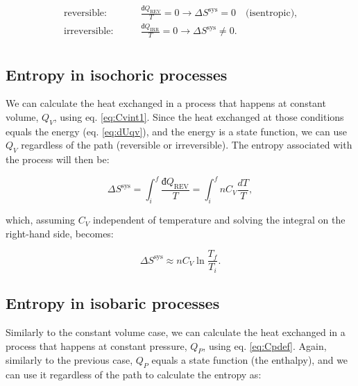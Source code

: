 \documentclass[
  9pt,
]{extbook}
\theoremstyle{definition}
\theoremstyle{definition}
\theoremstyle{definition}
\theoremstyle{remark}
\begin{document}
\begin{equation}
\begin{aligned}
\text{reversible:} \qquad & \frac{đQ_{\mathrm{REV}}}{T} = 0 \longrightarrow \Delta S^{\mathrm{sys}} = 0 \quad \text{(isentropic),}\\
\text{irreversible:} \qquad & \frac{đQ_{\mathrm{IRR}}}{T}  = 0 \longrightarrow \Delta S^{\mathrm{sys}} \neq 0. \\
\end{aligned}
\label{eq:adiabaticent}
\end{equation}

\hypertarget{entropy-in-isochoric-processes}{%
\subsection{Entropy in isochoric processes}\label{entropy-in-isochoric-processes}}

We can calculate the heat exchanged in a process that happens at constant volume, \(Q_V\), using eq. \eqref{eq:Cvint1}. Since the heat exchanged at those conditions equals the energy (eq. \eqref{eq:dUqv}), and the energy is a state function, we can use \(Q_V\) regardless of the path (reversible or irreversible). The entropy associated with the process will then be:

\begin{equation}
\Delta S^{\mathrm{sys}} = \int_i^f \frac{đQ_{\mathrm{REV}}}{T} = \int_i^f nC_V \frac{dT}{T},
\label{eq:sconstV1}
\end{equation}

which, assuming \(C_V\) independent of temperature and solving the integral on the right-hand side, becomes:

\begin{equation}
\Delta S^{\mathrm{sys}} \approx n C_V \ln \frac{T_f}{T_i}.
\label{eq:sconstV}
\end{equation}

\hypertarget{entropy-in-isobaric-processes}{%
\subsection{Entropy in isobaric processes}\label{entropy-in-isobaric-processes}}

Similarly to the constant volume case, we can calculate the heat exchanged in a process that happens at constant pressure, \(Q_P\), using eq. \eqref{eq:Cpdef}. Again, similarly to the previous case, \(Q_P\) equals a state function (the enthalpy), and we can use it regardless of the path to calculate the entropy as:
\end{document}
